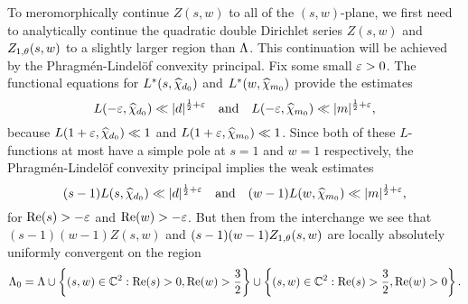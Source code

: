 \documentclass[12pt,reqno,oneside]{amsart}
\begin{document}
     To meromorphically continue $Z(s,w)$ to all of the $(s,w)$-plane, we first need to analytically continue the quadratic double Dirichlet series $Z(s,w)$ and $Z_{1,\theta}(s,w)$ to a slightly larger region than $\Lambda$. This continuation will be achieved by the Phragm\'en-Lindel\"of convexity principal. Fix some small $\varepsilon > 0$. The functional equations for $L^{\ast}(s,\widehat{\chi}_{d_{0}})$ and $L^{\ast}(w,\widehat{\chi}_{m_{0}})$ provide the estimates
    \[
        L(-\varepsilon,\widehat{\chi}_{d_{0}}) \ll |d|^{\frac{1}{2}+\varepsilon} \quad \text{and} \quad L(-\varepsilon,\widehat{\chi}_{m_{0}}) \ll |m|^{\frac{1}{2}+\varepsilon},
    \]
    because $L(1+\varepsilon,\widehat{\chi}_{d_{0}}) \ll 1$ and $L(1+\varepsilon,\widehat{\chi}_{m_{0}}) \ll 1$. Since both of these $L$-functions at most have a simple pole at $s = 1$ and $w = 1$ respectively, the Phragm\'en-Lindel\"of convexity principal implies the weak estimates
    \[
        (s-1)L(s,\widehat{\chi}_{d_{0}}) \ll |d|^{\frac{1}{2}+\varepsilon} \quad \text{and} \quad (w-1)L(w,\widehat{\chi}_{m_{0}}) \ll |m|^{\frac{1}{2}+\varepsilon},
    \]
    for $\mathrm{Re}(s) > -\varepsilon$ and $\mathrm{Re}(w) > -\varepsilon$. But then from the interchange we see that $(s-1)(w-1)Z(s,w)$ and $(s-1)(w-1)Z_{1,\theta}(s,w)$ are locally absolutely uniformly convergent on the region
    \[
        \Lambda_{0} = \Lambda \cup \left\{(s,w) \in \mathbb{C}^{2}:\mathrm{Re}(s) > 0, \mathrm{Re}(w) > \frac{3}{2}\right\} \cup \left\{(s,w) \in \mathbb{C}^{2}:\mathrm{Re}(s) > \frac{3}{2}, \mathrm{Re}(w) > 0\right\}.
    \]
    
    \begin{center}
    \end{center}
    
\end{document}
